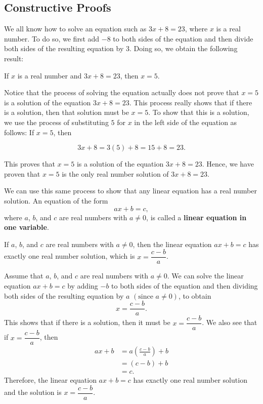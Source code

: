 \subsection*{Constructive Proofs}
%
We all know how to solve an equation such as $3x + 8 = 23$, where $x$ is a real number.  To do so, we first add $-8$ to both sides of the equation and then divide both sides of the resulting equation by 3.  Doing so, we obtain the following result:

\begin{center}
If $x$ is a real number and $3x + 8 = 23$, then $x = 5$.
\end{center}

Notice that the process of solving the equation actually does not prove that $x = 5$ is a solution of the equation $3x + 8 = 23$.  This process really shows that if there is a solution, then that solution must be $x = 5$.  To show that this is a solution, we use the process of substituting $5$ for $x$ in the left side of the equation as follows:  If 
$x = 5$, then

\[
3x + 8 = 3 \left( 5 \right) + 8 = 15 + 8 = 23.
\]

This proves that $x = 5$ is a solution of the equation $3x + 8 = 23$.  Hence, we have proven that $x = 5$ is the only real number solution of $3x + 8 = 23$.

We can use this same process to show that any linear equation has a real number solution.  An equation of the form
\[
ax + b = c,
\]
where $a$, $b$, and $c$ are real numbers with $a \ne 0$, is called a \textbf{linear equation in one variable}.  

\begin{proposition}\label{P:linearequation}
If $a$, $b$, and $c$ are real numbers with $a \ne 0$, then the linear equation $ax + b = c$ has exactly one real number solution, which is $x = \dfrac{c - b}{a}$. 
\end{proposition}

\begin{myproof}
Assume that $a$, $b$, and $c$ are real numbers with $a \ne 0$.  We can solve the linear equation $ax + b = c$ by adding $-b$ to both sides of the equation and then dividing both sides of the resulting equation by $a$ $\left( \text{since } a \ne 0 \right)$, to obtain
\[
x = \frac{c - b}{a}.
\]
This shows that if there is a solution, then it must be $x = \dfrac{c - b}{a}$.  We also see that if $x = \dfrac{c - b}{a}$, then
\[
\begin{aligned}
ax + b &= a \left( \frac{c - b}{a} \right) + b \\
       &= \left( c - b \right) + b \\
       &= c.
\end{aligned}
\]
Therefore, the linear equation $ax + b = c$ has exactly one real number solution and the solution is $x = \dfrac{c - b}{a}$.
\end{myproof}

